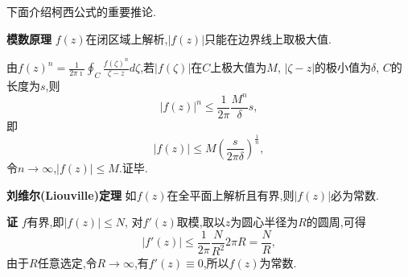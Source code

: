 下面介绍柯西公式的重要推论.

\textbf{模数原理} $f(z)$在闭区域上解析,$|f(z)|$只能在边界线上取极大值.

由$f(z)^n = \frac{1}{2\pi \imath} \oint_C \frac{f(\zeta)^n}{\zeta - z} d \zeta$,若$|f(\zeta)|$在$C$上极大值为$M$,
$|\zeta - z|$的极小值为$\delta$, $C$的长度为$s$,则
\[
  |f(z)|^n \leq \frac{1}{2\pi} \frac{M^n}{\delta} s  ,
\]
即
\[
    |f(z)| \leq M \left( \frac{s}{2\pi \delta} \right)^{\frac{1}{n}},
\]
令$n\to \infty$,$|f(z)| \leq M$.证毕.

\textbf{刘维尔(Liouville)定理} \quad 如$f(z)$在全平面上解析且有界,则$|f(z)|$必为常数.

\textbf{证} \quad $f$有界,即$|f(z)| \leq N$, 对$f'(z)$取模,取以$z$为圆心半径为$R$的圆周,可得
\[
  |f'(z)| \leq \frac{1}{2\pi} \frac{N} {R^2} 2\pi R = \frac{N}{R},
\]
由于$R$任意选定,令$R\to \infty$,有$f'(z) \equiv 0$,所以$f(z)$为常数.